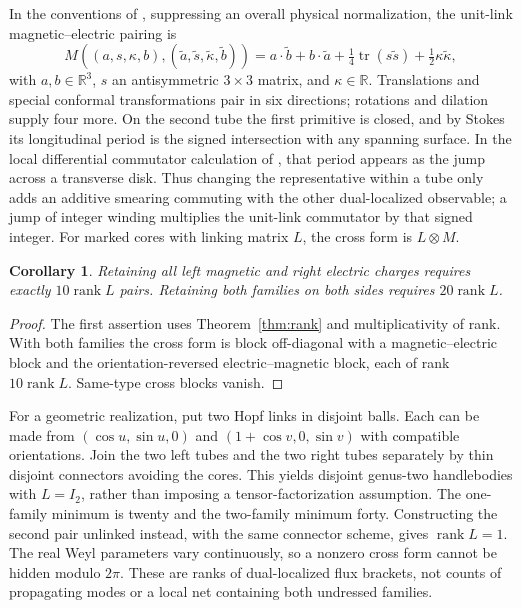 \documentclass[11pt]{article}
\newtheorem{corollary}[theorem]{Corollary}
\newcommand{\RR}{\mathbb R}
\newcommand{\rk}{\operatorname{rank}}
\begin{document}
In the conventions of \cite[Eq.~(3.50)]{BCM}, suppressing an overall physical normalization, the unit-link magnetic--electric pairing is
\[
 M((a,s,\kappa,b),(\widetilde a,\widetilde s,\widetilde\kappa,\widetilde b))
 =a\cdot\widetilde b+b\cdot\widetilde a
 +\tfrac14\operatorname{tr}(s\widetilde s)
 +\tfrac12\kappa\widetilde\kappa ,
\]
with \(a,b\in\RR^3\), \(s\) an antisymmetric \(3\times3\) matrix, and \(\kappa\in\RR\). Translations and special conformal transformations pair in six directions; rotations and dilation supply four more. On the second tube the first primitive is closed, and by Stokes its longitudinal period is the signed intersection with any spanning surface. In the local differential commutator calculation of \cite[Sec.~3.4]{BCM}, that period appears as the jump across a transverse disk. Thus changing the representative within a tube only adds an additive smearing commuting with the other dual-localized observable; a jump of integer winding multiplies the unit-link commutator by that signed integer. For marked cores with linking matrix \(L\), the cross form is \(L\otimes M\).

\begin{corollary}\label{cor:gravity-rank}
Retaining all left magnetic and right electric charges requires exactly \(10\rk L\) pairs. Retaining both families on both sides requires \(20\rk L\).
\end{corollary}
\begin{proof}
The first assertion uses Theorem~\ref{thm:rank} and multiplicativity of rank. With both families the cross form is block off-diagonal with a magnetic--electric block and the orientation-reversed electric--magnetic block, each of rank \(10\rk L\). Same-type cross blocks vanish.
\end{proof}

For a geometric realization, put two Hopf links in disjoint balls. Each can be made from \((\cos u,\sin u,0)\) and \((1+\cos v,0,\sin v)\) with compatible orientations. Join the two left tubes and the two right tubes separately by thin disjoint connectors avoiding the cores. This yields disjoint genus-two handlebodies with \(L=I_2\), rather than imposing a tensor-factorization assumption. The one-family minimum is twenty and the two-family minimum forty. Constructing the second pair unlinked instead, with the same connector scheme, gives \(\rk L=1\). The real Weyl parameters vary continuously, so a nonzero cross form cannot be hidden modulo \(2\pi\). These are ranks of dual-localized flux brackets, not counts of propagating modes or a local net containing both undressed families.
\end{document}
